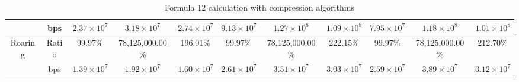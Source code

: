 \begin{table}[h]
{\begin{tabular}{|c|c|c|c|c|c|c|c|c|c|c|}
\cline{2-11}
& bps & $2.37 \times 10^{7}$ & $3.18 \times 10^{7}$ & $2.74 \times 10^{7}$ & $9.13 \times 10^{7}$ & $1.27 \times 10^{8}$ & $1.09 \times 10^{8}$ & $7.95 \times 10^{7}$ & $1.18 \times 10^{8}$ & $1.01 \times 10^{8}$ \\
\hline
\multirow{2}{*}{Roaring} & Ratio & 99.97\% & 78,125,000.00\% & 196.01\% & 99.97\% & 78,125,000.00\% & 222.15\% & 99.97\% & 78,125,000.00\% & 212.70\% \\
\cline{2-11}
& bps & $1.39 \times 10^{7}$ & $1.92 \times 10^{7}$ & $1.60 \times 10^{7}$ & $2.61 \times 10^{7}$ & $3.51 \times 10^{7}$ & $3.03 \times 10^{7}$ & $2.59 \times 10^{7}$ & $3.89 \times 10^{7}$ & $3.12 \times 10^{7}$ \\
\hline
\end{tabular}
}
\caption{Formula 12 calculation with compression algorithms}
\label{tbl:formulacompress12}
\end{table}


